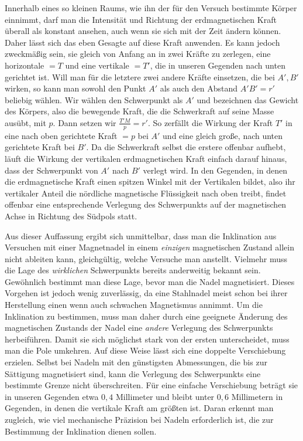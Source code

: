 Innerhalb eines so kleinen Raums, wie ihn der für den Versuch bestimmte Körper einnimmt, darf man die Intensität und Richtung der erdmagnetischen Kraft überall als konstant ansehen, auch wenn sie sich mit der Zeit ändern können. Daher lässt sich das eben Gesagte auf diese Kraft anwenden. Es kann jedoch zweckmäßig sein, sie gleich von Anfang an in zwei Kräfte zu zerlegen, eine horizontale $=T$ und eine vertikale $=T'$, die in unseren Gegenden nach unten gerichtet ist. Will man für die letztere zwei andere Kräfte einsetzen, die bei $A',B'$ wirken, so kann man sowohl den Punkt $A'$ als auch den Abstand $A'B'=r'$ beliebig wählen. Wir wählen den Schwerpunkt als $A'$ und bezeichnen das Gewicht des Körpers, also die bewegende Kraft, die die Schwerkraft auf seine Masse ausübt, mit $p$. Dann setzen wir $\frac{T'M}{p}=r'$. So zerfällt die Wirkung der Kraft $T'$ in eine nach oben gerichtete Kraft $=p$ bei $A'$ und eine gleich große, nach unten gerichtete Kraft bei $B'$. Da die Schwerkraft selbst die erstere offenbar aufhebt, läuft die Wirkung der vertikalen erdmagnetischen Kraft einfach darauf hinaus, dass der Schwerpunkt von $A'$ nach $B'$ verlegt wird. In den Gegenden, in denen die erdmagnetische Kraft einen spitzen Winkel mit der Vertikalen bildet, also ihr vertikaler Anteil die nördliche magnetische Flüssigkeit nach oben treibt, findet offenbar eine entsprechende Verlegung des Schwerpunkts auf der magnetischen Achse in Richtung des Südpols statt.

Aus dieser Auffassung ergibt sich unmittelbar, dass man die Inklination aus Versuchen mit einer Magnetnadel in einem \textit{einzigen} magnetischen Zustand allein nicht ableiten kann, gleichgültig, welche Versuche man anstellt. Vielmehr muss die Lage des \textit{wirklichen} Schwerpunkts bereits anderweitig bekannt sein. Gewöhnlich bestimmt man diese Lage, bevor man die Nadel magnetisiert. Dieses Vorgehen ist jedoch wenig zuverlässig, da eine Stahlnadel meist schon bei ihrer Herstellung einen wenn auch schwachen Magnetismus annimmt. Um die Inklination zu bestimmen, muss man daher durch eine geeignete Änderung des magnetischen Zustands der Nadel eine \textit{andere} Verlegung des Schwerpunkts herbeiführen. Damit sie sich möglichst stark von der ersten unterscheidet, muss man die Pole umkehren. Auf diese Weise lässt sich eine doppelte Verschiebung erzielen. Selbst bei Nadeln mit den günstigsten Abmessungen, die bis zur Sättigung magnetisiert sind, kann die Verlegung des Schwerpunkts eine bestimmte Grenze nicht überschreiten. Für eine einfache Verschiebung beträgt sie in unseren Gegenden etwa $0{,}4$ Millimeter und bleibt unter $0{,}6$ Millimetern in Gegenden, in denen die vertikale Kraft am größten ist. Daran erkennt man zugleich, wie viel mechanische Präzision bei Nadeln erforderlich ist, die zur Bestimmung der Inklination dienen sollen.

